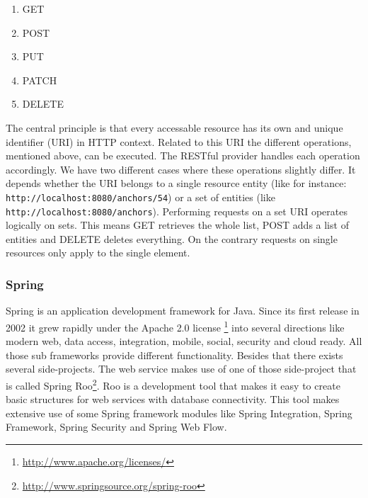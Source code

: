 \begin{enumerate}
\item GET
\item POST
\item PUT
\item PATCH
\item DELETE
\end{enumerate}

The central principle is that every accessable resource has its own and unique identifier (URI) in HTTP context. Related to this URI the different operations, mentioned above, can be executed. The RESTful provider handles each operation accordingly. We have two different cases where these operations slightly differ. It depends whether the URI belongs to a single resource entity (like for instance: \verb^http://localhost:8080/anchors/54^) or a set of entities (like \verb^http://localhost:8080/anchors^). Performing requests on a set URI operates logically on sets. This means GET retrieves the whole list, POST adds a list of entities and DELETE deletes everything. On the contrary requests on single resources only apply to the single element.  
	
\subsubsection*{Spring}
Spring is an application development framework for Java. Since its first release in 2002 it grew rapidly under the Apache 2.0 license \footnote{\url{http://www.apache.org/licenses/}} into several directions like modern web, data access, integration, mobile, social, security and cloud ready. All those sub frameworks provide different functionality. Besides that there exists several side-projects. The web service makes use of one of those side-project that is called Spring Roo\footnote{\url{http://www.springsource.org/spring-roo}}. Roo is a development tool that makes it easy to create basic structures for web services with database connectivity. This tool makes extensive use of some Spring framework modules like Spring Integration, Spring Framework, Spring Security and Spring Web Flow. 
	
